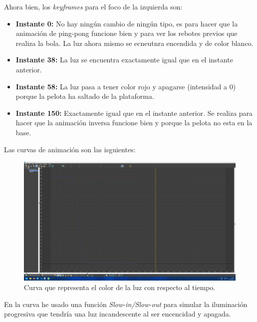 \documentclass{article}
\begin{document}
Ahora bien, los \textit{keyframes} para el foco de la izquierda son:

\begin{itemize}
    \item \textbf{Instante 0: }No hay ningún cambio de ningún tipo, es para hacer que la animación de ping-pong funcione bien y para ver los rebotes previos que realiza la bola. La luz ahora mismo se ecneutnra encendida y de color blanco.
    \item \textbf{Instante 38: }La luz se encuentra exactamente igual que en el instante anterior.
    \item \textbf{Instante 58: }La luz pasa a tener color rojo y apagarse (intensidad a 0) porque la pelota ha saltado de la plataforma.
    \item \textbf{Instante 150: }Exactamente igual que en el instante anterior. Se realiza para hacer que la animación inversa funcione bien y porque la pelota no esta en la base.
\end{itemize}

Las curvas de animación son las isguientes:

\begin{figure}[H]
    \centering
    \includegraphics[width=\textwidth]{imagenes/curvas/LL/filter.png}
    \caption{Curva que representa el color de la luz con respecto al tiempo.}
 \end{figure}

En la curva he usado una función \textit{Slow-in/Slow-out} para simular la iluminación progresiva que tendría una luz incandescente al ser encencidad y apagada.
\end{document}
